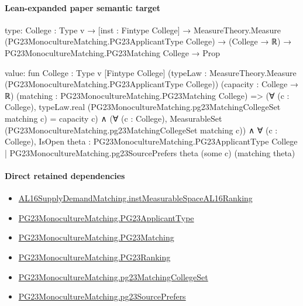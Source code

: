 \documentclass[10pt]{article}
\begin{document}
\paragraph{Lean-expanded paper semantic target}
\begin{ReviewVerbatim}
type:
{College : Type v} →
  [inst : Fintype College] →
    MeasureTheory.Measure (PG23MonocultureMatching.PG23ApplicantType College) →
      (College → ℝ) → PG23MonocultureMatching.PG23Matching College → Prop

value:
fun {College : Type v} [Fintype College]
    (typeLaw : MeasureTheory.Measure (PG23MonocultureMatching.PG23ApplicantType College)) (capacity : College → ℝ)
    (matching : PG23MonocultureMatching.PG23Matching College) =>
  (∀ (c : College), typeLaw.real (PG23MonocultureMatching.pg23MatchingCollegeSet matching c) = capacity c) ∧
    (∀ (c : College), MeasurableSet (PG23MonocultureMatching.pg23MatchingCollegeSet matching c)) ∧
      ∀ (c : College),
        IsOpen
          {theta : PG23MonocultureMatching.PG23ApplicantType College |
            PG23MonocultureMatching.pg23SourcePrefers theta (some c) (matching theta)}
\end{ReviewVerbatim}

\paragraph{Direct retained dependencies}
\begin{itemize}\raggedright
\item \hyperlink{governing-declaration-45aa1aca7604d942}{AL16\allowbreak{}Supply\allowbreak{}Demand\allowbreak{}Matching.\allowbreak{}inst\allowbreak{}Measurable\allowbreak{}Space\allowbreak{}AL16\allowbreak{}Ranking}
\item \hyperlink{paper-prerequisite-40ad59c353cf95ec}{PG23\allowbreak{}Monoculture\allowbreak{}Matching.\allowbreak{}PG23\allowbreak{}Applicant\allowbreak{}Type}
\item \hyperlink{paper-prerequisite-6458c12e2da75e1b}{PG23\allowbreak{}Monoculture\allowbreak{}Matching.\allowbreak{}PG23\allowbreak{}Matching}
\item \hyperlink{paper-prerequisite-8769258a80216d15}{PG23\allowbreak{}Monoculture\allowbreak{}Matching.\allowbreak{}PG23\allowbreak{}Ranking}
\item \hyperlink{paper-prerequisite-3828b62220d17122}{PG23\allowbreak{}Monoculture\allowbreak{}Matching.\allowbreak{}pg23\allowbreak{}Matching\allowbreak{}College\allowbreak{}Set}
\item \hyperlink{governing-declaration-a79bb975b740cd0d}{PG23\allowbreak{}Monoculture\allowbreak{}Matching.\allowbreak{}pg23\allowbreak{}Source\allowbreak{}Prefers}
\end{itemize}
\end{document}
